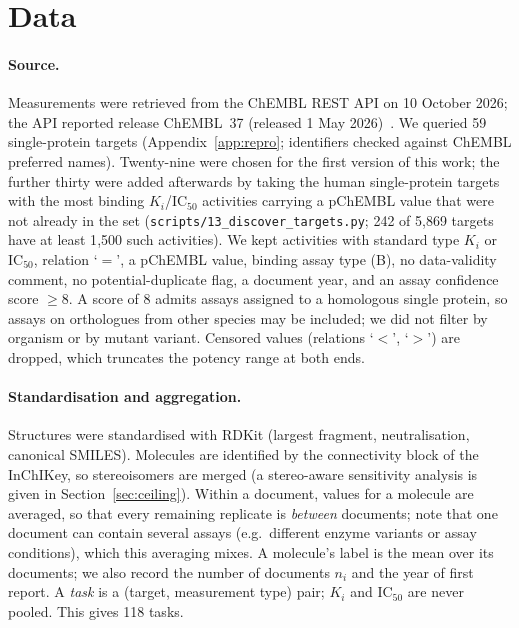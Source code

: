 \section{Data}\label{sec:data}
\paragraph{Source.}
Measurements were retrieved from the ChEMBL REST API on 10 October 2026; the API reported release ChEMBL~37 (released 1 May 2026)~\cite{zdrazil2024chembl}. We queried 59 single-protein targets (Appendix~\ref{app:repro}; identifiers checked against ChEMBL preferred names). Twenty-nine were chosen for the first version of this work; the further thirty were added afterwards by taking the human single-protein targets with the most binding $K_i$/$\mathrm{IC}_{50}$ activities carrying a pChEMBL value that were not already in the set (\texttt{scripts/}\allowbreak\texttt{13\_discover\_targets.py}; 242 of 5{,}869 targets have at least 1{,}500 such activities). We kept activities with standard type $K_i$ or $\mathrm{IC}_{50}$, relation `$=$', a pChEMBL value, binding assay type (B), no data-validity comment, no potential-duplicate flag, a document year, and an assay confidence score $\ge 8$. A score of 8 admits assays assigned to a homologous single protein, so assays on orthologues from other species may be included; we did not filter by organism or by mutant variant. Censored values (relations `$<$', `$>$') are dropped, which truncates the potency range at both ends.

\paragraph{Standardisation and aggregation.}
Structures were standardised with RDKit (largest fragment, neutralisation, canonical SMILES). Molecules are identified by the connectivity block of the InChIKey, so stereoisomers are merged (a stereo-aware sensitivity analysis is given in Section~\ref{sec:ceiling}). Within a document, values for a molecule are averaged, so that every remaining replicate is \emph{between} documents; note that one document can contain several assays (e.g.\ different enzyme variants or assay conditions), which this averaging mixes. A molecule's label is the mean over its documents; we also record the number of documents $n_i$ and the year of first report. A \emph{task} is a (target, measurement type) pair; $K_i$ and $\mathrm{IC}_{50}$ are never pooled. This gives 118 tasks.

